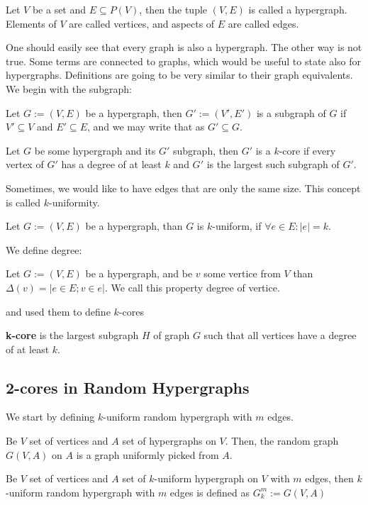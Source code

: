 \begin{defn}
    Let \(V\) be a set and \(E \subseteq P(V)\), then the tuple \((V, E)\) is called a hypergraph. Elements of \(V\) are called vertices, and aspects of \(E\) are called edges.
\end{defn}

One should easily see that every graph is also a hypergraph. The other way is not true. Some terms are connected to graphs, which would be useful to state also for hypergraphs. Definitions are going to be very similar to their graph equivalents. We begin with the subgraph:

\begin{defn}
    Let \(G:= (V, E)\) be a hypergraph, then \(G':= (V',E')\) is a subgraph of \(G\) if \(V'\subseteq V\) and \(E' \subseteq E\), and we may write that as \(G' \subseteq G\).
\end{defn}

\begin{defn}
    Let \(G\) be some hypergraph and its \(G'\) subgraph, then \(G'\) is a \(k\)-core if every vertex of \(G'\) has a degree of at least \(k\) and \(G'\) is the largest such subgraph of \(G'\).
\end{defn}

Sometimes, we would like to have edges that are only the same size. This concept is called $k$-uniformity.
\begin{defn}
    Let \(G:= (V, E)\) be a hypergraph, than $G$ is $k$-uniform, if $\forall e \in E : |e| = k$.
\end{defn}

We define degree:
\begin{defn}
    Let \(G:= (V, E)\) be a hypergraph, and be $v$ some vertice from $V$ than $\Delta(v) = |{e \in E; v\in e }|$. We call this property degree of vertice.
\end{defn}

and used them to define $k$-cores
\begin{defn}
   \textbf{k-core} is the largest subgraph \( H \) of graph \( G \) such that all vertices have a degree of at least \( k \). 
\end{defn}

\subsection{2-cores in Random Hypergraphs}

 We start by defining $k$-uniform random hypergraph with $m$ edges.
\begin{defn}
Be $V$ set of vertices and $A$ set of hypergraphs on $V$. Then, the random graph $G(V, A)$ on $A$ is a graph uniformly picked from $A$.
\end{defn}
 \begin{defn}
Be $V$ set of vertices and $A$ set of $k$-uniform hypergraph on $V$  with $m$ edges, then $k$-uniform random hypergraph with $m$ edges is defined as $G_k^m := G(V, A)$
 \end{defn}

